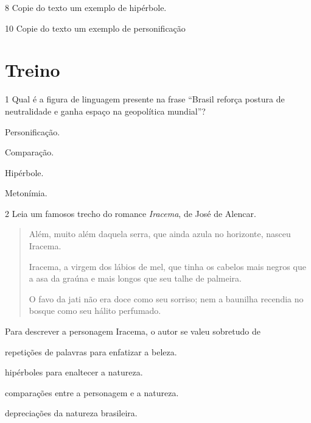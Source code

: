 \num{8} Copie do texto um exemplo de hipérbole.


\num{10} Copie do texto um exemplo de personificação


\section{Treino}

\num{1} Qual é a figura de linguagem presente na frase ``Brasil reforça postura de 
neutralidade e ganha espaço na geopolítica mundial''?

\begin{escolha}

  \item Personificação.
  
  \item Comparação.
  
  \item Hipérbole.
  
  \item Metonímia. 

\end{escolha}


\num{2} Leia um famosos trecho do romance \textit{Iracema}, de José de Alencar.

\begin{quote}

Além, muito além daquela serra, que ainda azula no
horizonte, nasceu Iracema.

Iracema, a virgem dos lábios de mel, que tinha os
cabelos mais negros que a asa da graúna e mais longos
que seu talhe de palmeira.

O favo da jati não era doce como seu sorriso; nem
a baunilha recendia no bosque como seu hálito perfumado.

\end{quote}




Para descrever a personagem Iracema, o autor se valeu sobretudo de

\begin{escolha}

  \item repetições de palavras para enfatizar a beleza. 

  \item hipérboles para enaltecer a natureza.

  \item comparações entre a personagem e a natureza.

  \item depreciações da natureza brasileira.

\end{escolha}


